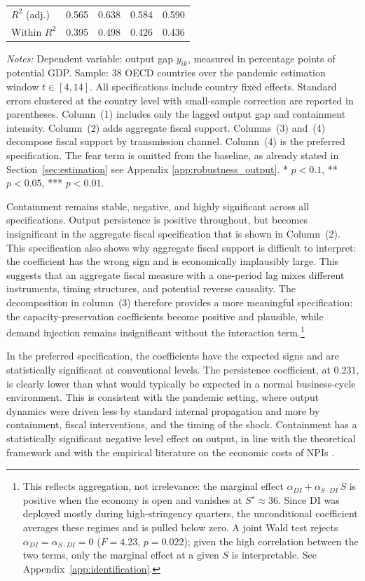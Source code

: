 \documentclass[12pt, a4paper]{article}
\begin{document}
\begin{table}[H]
\begin{tabular}{@{} l c c c c @{}}
$R^2$ (adj.) & 0.565 & 0.638 & 0.584 & 0.590 \\
Within $R^2$ & 0.395 & 0.498 & 0.426 & 0.436 \\
\bottomrule
\end{tabular}
\vspace{4pt}
\parbox{\textwidth}{\scriptsize\textit{Notes:} Dependent variable: output gap $y_{ik}$, measured in percentage points of potential GDP. Sample: 38 OECD countries over the pandemic estimation window $t \in [4,14]$. All specifications include country fixed effects. Standard errors clustered at the country level with small-sample correction are reported in parentheses. Column~(1) includes only the lagged output gap and containment intensity. Column~(2) adds aggregate fiscal support. Columns~(3) and~(4) decompose fiscal support by transmission channel. Column~(4) is the preferred specification. The fear term is omitted from the baseline, as already stated in Section~\ref{sec:estimation} see Appendix \ref{app:robustness_output}. * $p<0.1$, ** $p<0.05$, *** $p<0.01$.}
\end{table} 


\noindent Containment remains stable, negative, and highly significant across all specifications. Output persistence is positive throughout, but becomes insignificant in the aggregate fiscal specification that is shown in Column~(2). This specification also shows why aggregate fiscal support is difficult to interpret: the coefficient has the wrong sign and is economically implausibly large. This suggests that an aggregate fiscal measure with a one-period lag mixes different instruments, timing structures, and potential reverse causality. The decomposition in column~(3) therefore provides a more meaningful specification: the capacity-preservation coefficients become positive and plausible, while demand injection remains insignificant without the interaction term.\footnote{This reflects aggregation, not irrelevance: the marginal effect $\alpha_{DI}+\alpha_{S\cdot DI}\,S$ is positive when the economy is open and vanishes at $S^{\star}\approx 36$. Since DI was deployed mostly during high-stringency quarters, the unconditional coefficient averages these regimes and is pulled below zero. A joint Wald test rejects $\alpha_{DI}=\alpha_{S\cdot DI}=0$ ($F=4.23$, $p=0.022$); given the high correlation between the two terms, only the marginal effect at a given $S$ is interpretable. See Appendix~\ref{app:identification}.}

In the preferred specification, the coefficients have the expected signs and are statistically significant at conventional levels. The persistence coefficient, at $0.231$, is clearly lower than what would typically be expected in a normal business-cycle environment. This is consistent with the pandemic setting, where output dynamics were driven less by standard internal propagation and more by containment, fiscal interventions, and the timing of the shock. Containment has a statistically significant negative level effect on output, in line with the theoretical framework and with the empirical literature on the economic costs of NPIs \citep{deb2021, Ashraf2022}.
\end{document}
